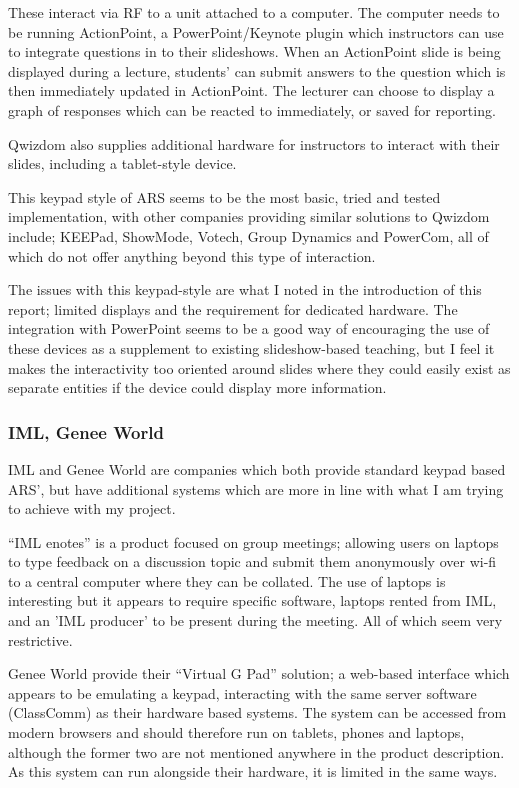 \documentclass[a4papert,11pt,notitlepage]{ltxdoc}
\begin{document}
These interact via RF to a unit attached to a computer. The computer needs to be running ActionPoint, a PowerPoint/Keynote plugin which instructors can use to integrate questions in to their slideshows. When an ActionPoint slide is being displayed during a lecture, students' can submit answers to the question which is then immediately updated in ActionPoint. The lecturer can choose to display a graph of responses which can be reacted to immediately, or saved for reporting.

Qwizdom also supplies additional hardware for instructors to interact with their slides, including a tablet-style device.

This keypad style of ARS seems to be the most basic, tried and tested implementation, with other companies providing similar solutions to Qwizdom include; KEEPad, ShowMode, Votech, Group Dynamics and PowerCom, all of which do not offer anything beyond this type of interaction.

The issues with this keypad-style are what I noted in the introduction of this report; limited displays and the requirement for dedicated hardware. The integration with PowerPoint seems to be a good way of encouraging the use of these devices as a supplement to existing slideshow-based teaching, but I feel it makes the interactivity too oriented around slides where they could easily exist as separate entities if the device could display more information.

\subsubsection{IML, Genee World}
IML\cite{iml:web} and Genee World\cite{genee:web} are companies which both provide standard keypad based ARS', but have additional systems which are more in line with what I am trying to achieve with my project.

``IML enotes'' is a product focused on group meetings; allowing users on laptops to type feedback on a discussion topic and submit them anonymously over wi-fi to a central computer where they can be collated. The use of laptops is interesting but it appears to require specific software, laptops rented from IML, and an 'IML producer' to be present during the meeting. All of which seem very restrictive.

Genee World provide their ``Virtual G Pad'' solution; a web-based interface which appears to be emulating a keypad, interacting with the same server software (ClassComm) as their hardware based systems. The system can be accessed from modern browsers and should therefore run on tablets, phones and laptops, although the former two are not mentioned anywhere in the product description. As this system can run alongside their hardware, it is limited in the same ways.
\end{document}
